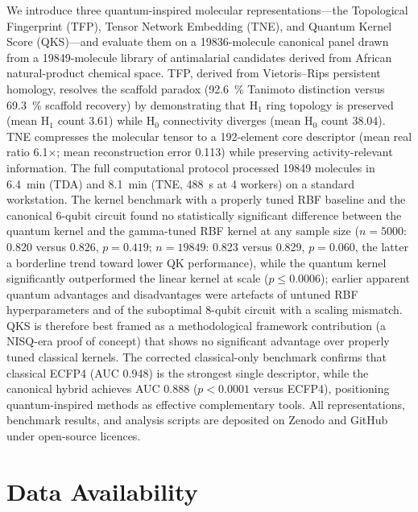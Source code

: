 \documentclass[11pt,a4paper]{article}
\begin{document}
We introduce three quantum-inspired molecular representations---the Topological Fingerprint (TFP), Tensor Network Embedding (TNE), and Quantum Kernel Score (QKS)---and evaluate them on a \num{19836}-molecule canonical panel drawn from a \num{19849}-molecule library of antimalarial candidates derived from African natural-product chemical space. TFP, derived from Vietoris--Rips persistent homology, resolves the scaffold paradox (\qty{92.6}{\percent} Tanimoto distinction versus \qty{69.3}{\percent} scaffold recovery) by demonstrating that H$_1$ ring topology is preserved (mean H$_1$ count \num{3.61}) while H$_0$ connectivity diverges (mean H$_0$ count \num{38.04}). TNE compresses the molecular tensor to a \num{192}-element core descriptor (mean real ratio \num{6.1}$\times$; mean reconstruction error \num{0.113}) while preserving activity-relevant information. The full computational protocol processed \num{19849} molecules in \SI{6.4}{\minute} (TDA) and \SI{8.1}{\minute} (TNE, \SI{488}{\second} at 4 workers) on a standard workstation. The kernel benchmark with a properly tuned RBF baseline and the canonical 6-qubit circuit found no statistically significant difference between the quantum kernel and the gamma-tuned RBF kernel at any sample size ($n = \num{5000}$: \num{0.820} versus \num{0.826}, $p = \num{0.419}$; $n = \num{19849}$: \num{0.823} versus \num{0.829}, $p = \num{0.060}$, the latter a borderline trend toward lower QK performance), while the quantum kernel significantly outperformed the linear kernel at scale ($p \leq \num{0.0006}$); earlier apparent quantum advantages and disadvantages were artefacts of untuned RBF hyperparameters and of the suboptimal 8-qubit circuit with a scaling mismatch. QKS is therefore best framed as a methodological framework contribution (a NISQ-era proof of concept) that shows no significant advantage over properly tuned classical kernels. The corrected classical-only benchmark confirms that classical ECFP4 (AUC \num{0.948}) is the strongest single descriptor, while the canonical hybrid achieves AUC \num{0.888} ($p < \num{0.0001}$ versus ECFP4), positioning quantum-inspired methods as effective complementary tools. All representations, benchmark results, and analysis scripts are deposited on Zenodo and GitHub under open-source licences.


\section*{Data Availability}
\end{document}
